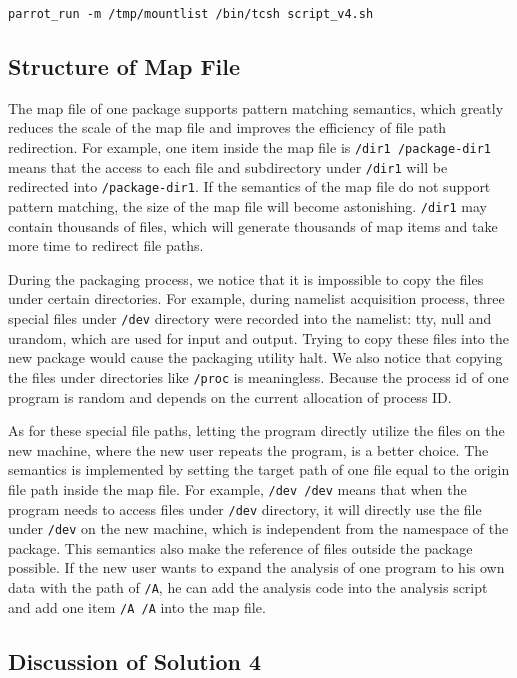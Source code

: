 \documentclass{acm_proc_article-sp}
\begin{document}
{\tt parrot\_run -m /tmp/mountlist /bin/tcsh script\_v4.sh}

\subsection{Structure of Map File} 

The map file of one package supports pattern matching semantics,
which greatly reduces the scale of the map file and improves the efficiency of file path redirection. 
For example,
one item inside the map file is {\tt /dir1 /package-dir1} means that the access to each file and
subdirectory under {\tt /dir1} will be redirected into {\tt /package-dir1}.
If the semantics of the map file do not support pattern matching, the size of the map file will become astonishing. 
{\tt /dir1} may contain thousands of files, which will generate thousands of map items and take more time to redirect file paths.

During the packaging process, we notice
that it is impossible to copy the files under certain directories.
For example, during namelist acquisition process, three special files under {\tt /dev} directory were recorded into the namelist: tty, null and urandom, which are used for input and output.
Trying to copy these files into the new package would cause the packaging utility halt.
We also notice that copying the files under directories like {\tt /proc} is
meaningless. Because the process id of one program is random and depends on the
current allocation of process ID. 

As for these special file paths, letting
the program directly utilize the files on the new machine, where the new user
repeats the program, is a better choice. The semantics is implemented by
setting the target path of one file equal to the origin file path inside the
map file. For example, {\tt /dev /dev} means that when the program needs to access
files under {\tt /dev} directory, it will directly use the file under {\tt /dev} on the new machine, which is
independent from the namespace of the package. This semantics also make the
reference of files outside the package possible. If the new user wants to
expand the analysis of one program to his own data with the path of {\tt /A}, he can add the analysis
code into the analysis script and add one item {\tt /A /A} into the map file.


\subsection{Discussion of Solution 4} 
\end{document}
